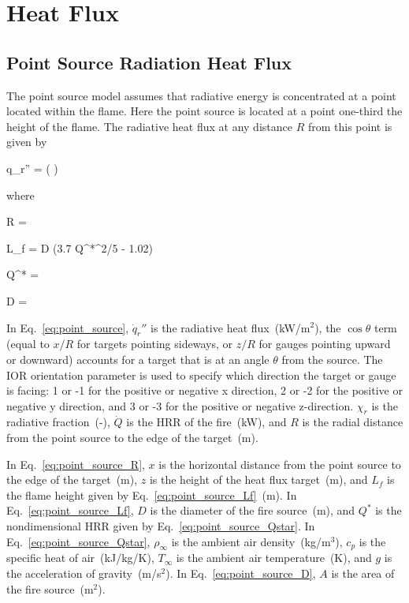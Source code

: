 
\chapter{Heat Flux}
\label{Heat_Flux_Chapter}

\section{Point Source Radiation Heat Flux}

The point source model assumes that radiative energy is concentrated at a point located within the flame.
Here the point source is located at a point one-third the height of the flame.
The radiative heat flux at any distance $R$ from this point is given by

\be
\dot q_r'' = \cos\theta \left(  \right)
\label{eq:point_source}
\ee

\noindent where

\be
R = 
\label{eq:point_source_R}
\ee

\be
L_f = D (3.7 Q^{*^{2/5}} - 1.02)
\label{eq:point_source_Lf}
\ee

\be
Q^* = 
\label{eq:point_source_Qstar}
\ee

\be
D = 
\label{eq:point_source_D}
\ee

In Eq.~\ref{eq:point_source}, $\dot q_r''$ is the radiative heat flux~(kW/m$^2$), the $\cos\theta$ term (equal to $x/R$ for targets pointing sideways, or $z/R$ for gauges pointing upward or downward) accounts for a target that is at an angle $\theta$ from the source. The IOR orientation parameter is used to specify which direction the target or gauge is facing: 1 or -1 for the positive or negative x direction, 2 or -2 for the positive or negative y direction, and 3 or -3 for the positive or negative z-direction. $\chi_r$ is the radiative fraction~(-), $\dot Q$ is the HRR of the fire~(kW), and $R$ is the radial distance from the point source to the edge of the target~(m).

In Eq.~\ref{eq:point_source_R}, $x$ is the horizontal distance from the point source to the edge of the target~(m), $z$ is the height of the heat flux target~(m), and $L_f$ is the flame height given by Eq.~\ref{eq:point_source_Lf}~(m).
In Eq.~\ref{eq:point_source_Lf}, $D$ is the diameter of the fire source~(m), and $Q^*$ is the nondimensional HRR given by Eq.~\ref{eq:point_source_Qstar}. In Eq.~\ref{eq:point_source_Qstar}, $\rho_\infty$ is the ambient air density~(kg/m$^3$), $c_p$ is the specific heat of air~(kJ/kg/K), $T_\infty$ is the ambient air temperature~(K), and $g$ is the acceleration of gravity~(m/s$^2$). In Eq.~\ref{eq:point_source_D}, $A$ is the area of the fire source~(m$^2$).


